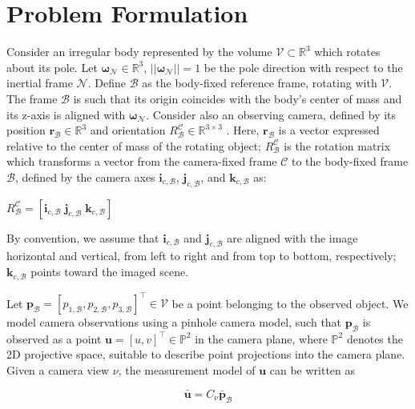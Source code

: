 \section{Problem Formulation}

Consider an irregular body represented by the volume $\mathcal{V}\subset \mathbb{R}^3$ which rotates about its pole. Let $\boldsymbol{\omega}_\mathcal{N} \in \mathbb{R}^3,\, ||\boldsymbol{\omega}_\mathcal{N}||=1$ be the pole direction with respect to the inertial frame $\mathcal{N}$. Define $\mathcal{B}$ as the body-fixed reference frame, rotating with $\mathcal{V}$. The frame $\mathcal{B}$ is such that its origin coincides with the body's center of mass and its z-axis is aligned with  $\boldsymbol{\omega}_\mathcal{N}$. Consider also an observing camera, defined by its position $\mathbf{r}_\mathcal{B} \in \mathbb{R}^3$ and orientation $R^{\mathcal{C}}_\mathcal{B} \in \mathbb{R}^{3\times 3}$ . Here, $\mathbf{r}_\mathcal{B}$ is a vector expressed relative to the center of mass of the rotating object; $R^{\mathcal{C}}_\mathcal{B}$ is the rotation matrix which transforms a vector from the camera-fixed frame $\mathcal{C}$ to the body-fixed frame $\mathcal{B}$, defined by the camera axes $\mathbf{i}_{c,\mathcal{B}}$, $\mathbf{j}_{c,\mathcal{B}}$, and $\mathbf{k}_{c,\mathcal{B}}$ as:

$R^\mathcal{C}_\mathcal{B} = [\mathbf{i}_{c,\mathcal{B}} \; \mathbf{j}_{c,\mathcal{B}} \; \mathbf{k}_{c,\mathcal{B}}  ]$

By convention, we assume that $\mathbf{i}_{c,\mathcal{B}}$ and $\mathbf{j}_{c,\mathcal{B}}$ are aligned with the image horizontal and vertical, from left to right and from top to bottom, respectively; $\mathbf{k}_{c,\mathcal{B}}$ points toward the imaged scene.

Let $\mathbf{p}_\mathcal{B}=[p_{1,\mathcal{B}},p_{2,\mathcal{B}},p_{3,\mathcal{B}}]^\top\in\mathcal{V}$ be a point belonging to the observed object. We model camera observations using a pinhole camera model, such that $\mathbf{p}_\mathcal{B}$ is observed as a point $\mathbf{u}=[u,v]^\top\in\mathbb{P}^2$ in the camera plane, where $\mathbb{P}^2$ denotes the 2D projective space, suitable to describe point projections into the camera plane\cite{henry2023absolute}. Given a camera view $\nu$, the measurement model of $\mathbf{u}$ can be written as

\begin{equation}
    \bar{\mathbf{u}} = C_\nu \bar{\mathbf{p}}_\mathcal{B}
\end{equation}

